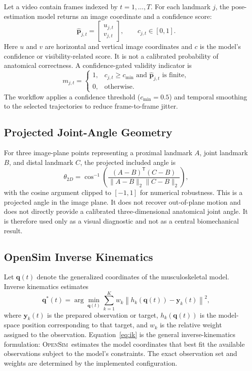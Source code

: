 \documentclass[11pt,a4paper]{article}
\newcommand{\OpenSim}{\textsc{OpenSim}}
\begin{document}
Let a video contain frames indexed by $t=1,\ldots,T$. For each landmark $j$, the pose-estimation model returns an image coordinate and a confidence score:
\begin{equation}
\widehat{\mathbf{p}}_{j,t}
=
\begin{bmatrix}
u_{j,t}\\v_{j,t}
\end{bmatrix},
\qquad
c_{j,t}\in[0,1].
\end{equation}
Here $u$ and $v$ are horizontal and vertical image coordinates and $c$ is the model's confidence or visibility-related score. It is not a calibrated probability of anatomical correctness. A confidence-gated validity indicator is
\begin{equation}
m_{j,t} =
\begin{cases}
1, & c_{j,t}\geq c_{\min}\text{ and }\widehat{\mathbf{p}}_{j,t}\text{ is finite},\\
0, & \text{otherwise}.
\end{cases}
\end{equation}
The workflow applies a confidence threshold ($c_{\min}=0.5$) and temporal smoothing to the selected trajectories to reduce frame-to-frame jitter.

\subsection{Projected Joint-Angle Geometry}

For three image-plane points representing a proximal landmark $A$, joint landmark $B$, and distal landmark $C$, the projected included angle is
\begin{equation}
\theta_{2D}
=
\cos^{-1}\left(
\frac{(A-B)^{\mathsf T}(C-B)}
{\|A-B\|_2\|C-B\|_2}
\right),
\end{equation}
with the cosine argument clipped to $[-1,1]$ for numerical robustness. This is a projected angle in the image plane. It does not recover out-of-plane motion and does not directly provide a calibrated three-dimensional anatomical joint angle. It is therefore used only as a visual diagnostic and not as a central biomechanical result.

\subsection{OpenSim Inverse Kinematics}

Let $\mathbf{q}(t)$ denote the generalized coordinates of the musculoskeletal model. Inverse kinematics estimates
\begin{equation}
\mathbf{q}^{*}(t)
=
\arg\min_{\mathbf{q}(t)}
\sum_{k=1}^{K}
w_k
\left\|
h_k(\mathbf{q}(t))-\mathbf{y}_k(t)
\right\|^2,
\label{eq:ik}
\end{equation}
where $\mathbf{y}_k(t)$ is the prepared observation or target, $h_k(\mathbf{q}(t))$ is the model-space position corresponding to that target, and $w_k$ is the relative weight assigned to the observation. Equation~\ref{eq:ik} is the general inverse-kinematics formulation: \OpenSim\ estimates the model coordinates that best fit the available observations subject to the model's constraints. The exact observation set and weights are determined by the implemented configuration.
\end{document}

